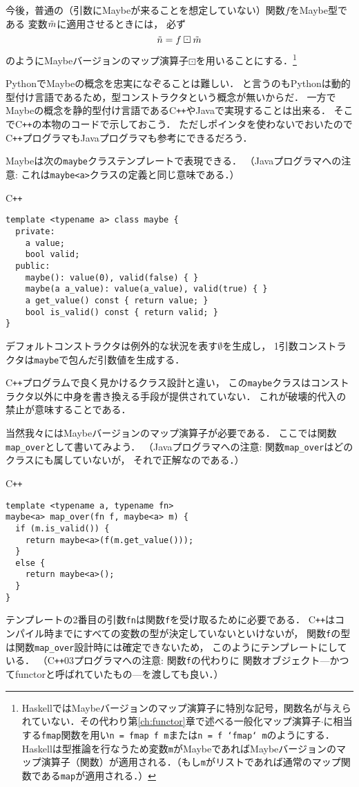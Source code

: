 \documentclass[a5paper,draft]{jsbook}
\newcommand{\programminglanguage}[1]{\textsf{#1}}
\newcommand{\cxx}{\programminglanguage{C}\texttt{++}}
\newcommand{\haskell}{\programminglanguage{Haskell}}
\newcommand{\java}{\programminglanguage{Java}}
\newcommand{\python}{\programminglanguage{Python}}
\newcommand{\code}[1]{\texttt{#1}}
\newenvironment{cxxcode}{\begin{itembox}[r]{\cxx}}{\end{itembox}}
\newcommand{\mathMaybeVar}[1]{\Tilde{#1}}
\newcommand{\mathNothing}{\emptyset}
\newcommand{\mathGeneralMap}{\mathbin{\cdot}}
\newcommand{\mathMaybeMap}{\mathbin{\boxdot}}
\begin{document}
今後，普通の（引数にMaybeが来ることを想定していない）関数$f$をMaybe型である
変数$\mathMaybeVar{m}$に適用させるときには，
必ず
$$
\mathMaybeVar{n}=f\mathMaybeMap\mathMaybeVar{m}
$$
のようにMaybeバージョンのマップ演算子$\mathMaybeMap$を用いることにする．\footnote{\haskell ではMaybeバージョンのマップ演算子に特別な記号，関数名が与えられていない．その代わり第\ref{ch:functor}章で述べる一般化マップ演算子$\mathGeneralMap$に相当する\code{fmap}関数を用い\code{n = fmap f m}または\code{n = f `fmap` m}のようにする．\haskell は型推論を行なうため変数\code{m}がMaybeであればMaybeバージョンのマップ演算子（関数）が適用される．（もし\code{m}がリストであれば通常のマップ関数である\code{map}が適用される．）}

\python でMaybeの概念を忠実になぞることは難しい．
と言うのも\python は動的型付け言語であるため，型コンストラクタという概念が無いからだ．
一方でMaybeの概念を静的型付け言語である\cxx や\java で実現することは出来る．
そこで\cxx の本物のコードで示しておこう．
ただしポインタを使わないでおいたので\cxx プログラマも\java プログラマも参考にできるだろう．

Maybeは次の\code{maybe}クラステンプレートで表現できる．
（\java プログラマへの注意: これは\code{maybe<a>}クラスの定義と同じ意味である．）
\begin{cxxcode}
\begin{verbatim}
template <typename a> class maybe {
  private:
    a value;
    bool valid;
  public:
    maybe(): value(0), valid(false) { }
    maybe(a a_value): value(a_value), valid(true) { }
    a get_value() const { return value; }
    bool is_valid() const { return valid; }
}
\end{verbatim}
\end{cxxcode}
デフォルトコンストラクタは例外的な状況を表す$\mathNothing$を生成し，
1引数コンストラクタは\code{maybe}で包んだ引数値を生成する．

\cxx プログラムで良く見かけるクラス設計と違い，
この\code{maybe}クラスはコンストラクタ以外に中身を書き換える手段が提供されていない．
これが破壊的代入の禁止が意味することである．

当然我々にはMaybeバージョンのマップ演算子が必要である．
ここでは関数\code{map\_over}として書いてみよう．
（\java プログラマへの注意: 関数\code{map\_over}はどのクラスにも属していないが，
それで正解なのである．）
\begin{cxxcode}
\begin{verbatim}
template <typename a, typename fn>
maybe<a> map_over(fn f, maybe<a> m) {
  if (m.is_valid()) {
    return maybe<a>(f(m.get_value()));
  }
  else {
    return maybe<a>();
  }
}
\end{verbatim}
\end{cxxcode}
テンプレートの2番目の引数\code{fn}は関数\code{f}を受け取るために必要である．
\cxx はコンパイル時までにすべての変数の型が決定していないといけないが，
関数\code{f}の型は関数\code{map\_over}設計時には確定できないため，
このようにテンプレートにしている．
（\cxx03プログラマへの注意: 関数\code{f}の代わりに
関数オブジェクト---かつてfunctorと呼ばれていたもの---を渡しても良い．）
\end{document}
